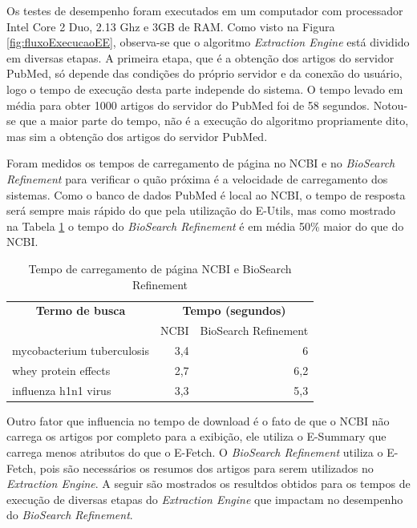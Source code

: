 Os testes de desempenho foram executados em um computador com processador Intel Core 2 Duo, 2.13 Ghz e 3GB de RAM. Como visto na Figura  \ref{fig:fluxoExecucaoEE}, observa-se que o algoritmo \emph{Extraction Engine} está dividido em diversas etapas. A primeira etapa, que é a obtenção dos artigos do servidor PubMed, só depende das condições do próprio servidor e da conexão do usuário, logo o tempo de execução desta parte independe do sistema. O tempo levado em média para obter 1000 artigos do servidor do PubMed foi de 58 segundos. Notou-se que a maior parte do tempo, não é a execução do algoritmo propriamente dito, mas sim a obtenção dos artigos do servidor PubMed.

Foram medidos os tempos de carregamento de página no NCBI e no \emph{BioSearch Refinement} para verificar o quão próxima é a velocidade de carregamento dos sistemas. Como o banco de dados PubMed é local ao NCBI, o tempo de resposta será sempre mais rápido do que pela utilização do E-Utils, mas como mostrado na Tabela \ref{tab:temposCarregamentoNCBIvsBSR} o tempo do \emph{BioSearch Refinement} é em média 50\% maior do que do NCBI.

\begin{table}[htbp]
\center
\begin{tabular}{|l|r|r|}
\hline
\multicolumn{ 1}{|c|}{\textbf{Termo de busca}} & \multicolumn{ 2}{c|}{\textbf{Tempo (segundos)}} \\ \cline{ 2- 3}
\multicolumn{ 1}{|l|}{} & \multicolumn{1}{l|}{NCBI} & \multicolumn{1}{l|}{BioSearch Refinement} \\ \hline
mycobacterium tuberculosis & 3,4 & 6 \\ \hline
whey protein effects & 2,7 & 6,2 \\ \hline
influenza h1n1 virus & 3,3 & 5,3 \\ \hline
\end{tabular}
\caption{Tempo de carregamento de página NCBI e BioSearch Refinement}
\label{tab:temposCarregamentoNCBIvsBSR}
\end{table}

Outro fator que influencia no tempo de download é o fato de que o NCBI não carrega os artigos por completo para a exibição, ele utiliza o E-Summary que carrega menos atributos do que o E-Fetch. O \emph{BioSearch Refinement} utiliza o E-Fetch, pois são necessários os resumos dos artigos para serem utilizados no \emph{Extraction Engine}. A seguir são mostrados os resultdos obtidos para os tempos de execução de diversas etapas do \emph{Extraction Engine} que impactam no desempenho do \emph{BioSearch Refinement}.


